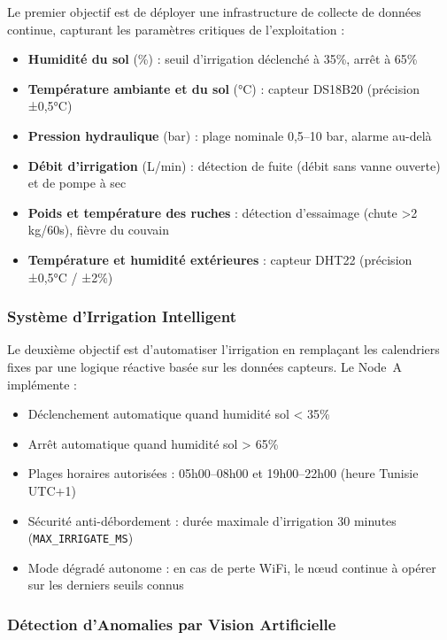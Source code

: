 \documentclass[12pt, a4paper]{report}
\begin{document}
Le premier objectif est de déployer une infrastructure de collecte de données continue, capturant les paramètres critiques de l'exploitation :

\begin{itemize}[leftmargin=*, label=\textcolor{primary}{$\bullet$}]
    \item \textbf{Humidité du sol} (\%) : seuil d'irrigation déclenché à 35\%, arrêt à 65\%
    \item \textbf{Température ambiante et du sol} (°C) : capteur DS18B20 (précision ±0,5°C)
    \item \textbf{Pression hydraulique} (bar) : plage nominale 0,5--10 bar, alarme au-delà
    \item \textbf{Débit d'irrigation} (L/min) : détection de fuite (débit sans vanne ouverte) et de pompe à sec
    \item \textbf{Poids et température des ruches} : détection d'essaimage (chute >2 kg/60s), fièvre du couvain
    \item \textbf{Température et humidité extérieures} : capteur DHT22 (précision ±0,5°C / ±2\%)
\end{itemize}

\subsubsection{Système d'Irrigation Intelligent}

Le deuxième objectif est d'automatiser l'irrigation en remplaçant les calendriers fixes par une logique réactive basée sur les données capteurs. Le Node~A implémente :

\begin{itemize}[leftmargin=*, label=\textcolor{primary}{$\bullet$}]
    \item Déclenchement automatique quand humidité sol < 35\%
    \item Arrêt automatique quand humidité sol > 65\%
    \item Plages horaires autorisées : 05h00--08h00 et 19h00--22h00 (heure Tunisie UTC+1)
    \item Sécurité anti-débordement : durée maximale d'irrigation 30 minutes (\texttt{MAX\_IRRIGATE\_MS})
    \item Mode dégradé autonome : en cas de perte WiFi, le nœud continue à opérer sur les derniers seuils connus
\end{itemize}

\subsubsection{Détection d'Anomalies par Vision Artificielle}
\end{document}
